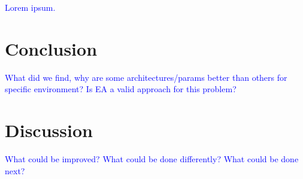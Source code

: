 \documentclass{article}
\newcommand{\TODO}[1]{\textcolor{blue}{#1}}
\begin{document}
\TODO{Lorem ipsum.}

\section{Conclusion}
\label{sec:conc}

\TODO{
    What did we find, why are some architectures/params better than others for specific environment?
    Is EA a valid approach for this problem?
}

\section{Discussion}
\label{sec:disc}

\TODO{
    What could be improved?
    What could be done differently?
    What could be done next?
}


\end{document}

